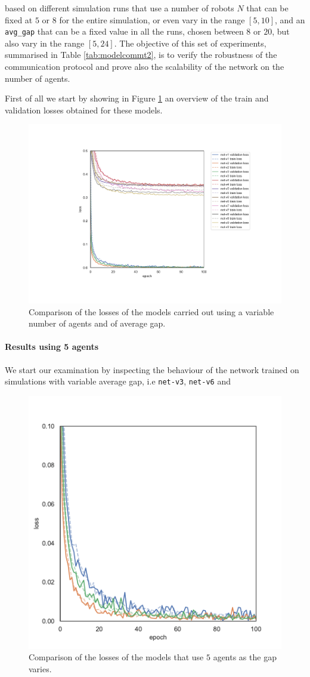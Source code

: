 \noindent
based on different simulation runs that use a number of robots $N$ that 
can be fixed at $5$ or $8$ for the entire simulation, or even vary in the range $[5, 
10]$, and an \texttt{avg\_gap} that can be a fixed value in all the runs, chosen 
between $8$ or $20$, but also vary in the range $[5, 24]$. 
The objective of this set of experiments, summarised in Table 
\ref{tab:modelcommt2}, is to verify the robustness of the communication 
protocol and prove also the scalability of the network on the number of agents.

First of all we start by showing in Figure \ref{fig:t2lossallt} an overview of the train 
and validation losses obtained for these models.
\begin{figure}[!htb]
	\centering
	\includegraphics[width=.8\textwidth]{contents/images/task2/loss-communication-all@}%
	\caption[Comparison of losses of the second set of experiments.]{Comparison 
		of the losses of the models carried out using a variable number of agents and 
		of average gap.}
	\label{fig:t2lossallt}
\end{figure}

\paragraph*{Results using 5 agents}

We start our examination by inspecting the behaviour of the network trained on 
simulations with variable average gap, i.e \texttt{net-v3}, \texttt{net-v6} and 
\begin{figure}[!htb]
	\centering
	\includegraphics[width=.45\textwidth]{contents/images/task2/loss-communication-N5}
	\caption[Comparison of the losses of the models that use $5$ 
	agents.]{Comparison of the losses of the models that use $5$ agents as 
		the gap varies.}
	\label{fig:commlossn5t2}
\end{figure}

